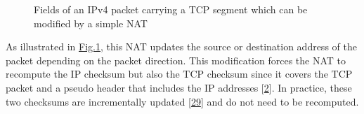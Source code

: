 \documentclass[letterpaper,10pt,english]{sphinxmanual}
\begin{document}
\begin{figure}[htbp]\centering\capstart{}\caption{Fields of an IPv4 packet carrying a TCP segment which can be modified by a simple NAT}\label{\detokenize{mptcp:id79}}\label{\detokenize{mptcp:fig-mptcp-ip4tcp-nat}}\end{figure}
\sphinxAtStartPar
As illustrated in \hyperref[\detokenize{mptcp:fig-mptcp-ip4tcp-nat}]{Fig.\@ \ref{\detokenize{mptcp:fig-mptcp-ip4tcp-nat}}}, this NAT updates the source or destination address of the packet depending on the packet direction. This modification forces the NAT to recompute the IP checksum but also the TCP checksum since it covers the TCP packet and a pseudo header that includes the IP addresses {[}\hyperlink{cite.biblio:id729}{2}{]}. In practice, these two checksums are incrementally updated {[}\hyperlink{cite.biblio:id2952}{29}{]} and do not need to be recomputed.
\end{document}
